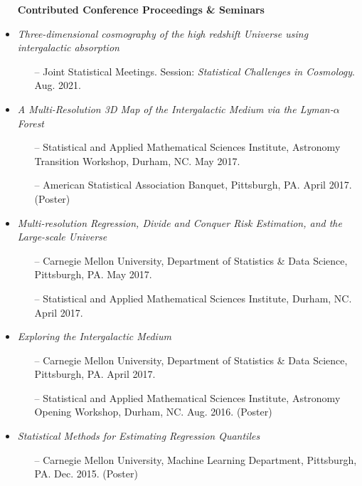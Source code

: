 \documentclass[letterpaper,10pt]{article}
\begin{document}
\begin{itemize}[itemsep=0.3cm, leftmargin=0.6cm]
\item[] \hspace{-5ex} {\bf \fontsize{10}{48} \selectfont Contributed Conference Proceedings \& Seminars} 
\vspace{-0.05cm}

\item {\it Three-dimensional cosmography of the high redshift Universe using intergalactic absorption}
\begin{itemize}[leftmargin=0.55cm, itemsep=0.1cm]
\item[--] Joint Statistical Meetings. Session: {\it Statistical Challenges in Cosmology}. Aug. 2021.
\end{itemize}

\item {\it A Multi-Resolution 3D Map of the Intergalactic Medium via the Lyman-$\alpha$ Forest}
\begin{itemize}[leftmargin=0.55cm, itemsep=0.1cm]
\item[--] Statistical and Applied Mathematical Sciences Institute, Astronomy Transition Workshop, Durham, NC. May 2017.
\item[--] American Statistical Association Banquet, Pittsburgh, PA. April 2017. (Poster)
\end{itemize}

\item {\it Multi-resolution Regression, Divide and Conquer Risk Estimation, and the Large-scale Universe}
\begin{itemize}[leftmargin=0.55cm, itemsep=0.1cm]
\item[--] Carnegie Mellon University, Department of Statistics \& Data Science, Pittsburgh, PA. May 2017.
\item[--] Statistical and Applied Mathematical Sciences Institute, Durham, NC. April 2017.
\end{itemize}

\item {\it Exploring the Intergalactic Medium}
\begin{itemize}[leftmargin=0.55cm, itemsep=0.1cm]
\item[--] Carnegie Mellon University, Department of Statistics \& Data Science, Pittsburgh, PA. April 2017.
\item[--] Statistical and Applied Mathematical Sciences Institute, Astronomy Opening Workshop, Durham, NC. Aug. 2016. (Poster)
\end{itemize}

\item {\it Statistical Methods for Estimating Regression Quantiles}
\begin{itemize}[leftmargin=0.55cm, itemsep=0.1cm]
\item[--] Carnegie Mellon University, Machine Learning Department, Pittsburgh, PA. Dec. 2015. (Poster)
\end{itemize}
\end{itemize}
\end{document}
